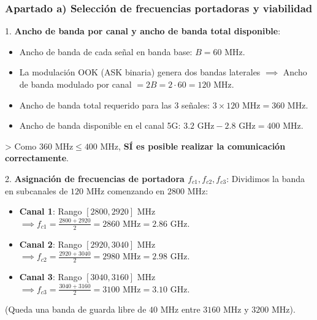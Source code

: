 \begin{resolucion}
\subsubsection*{Apartado a) Selección de frecuencias portadoras y viabilidad}

1. \textbf{Ancho de banda por canal y ancho de banda total disponible}:
   \begin{itemize}
       \item Ancho de banda de cada señal en banda base: $B = 60$ MHz.
       \item La modulación OOK (ASK binaria) genera dos bandas laterales $\implies$ Ancho de banda modulado por canal $= 2B = 2 \cdot 60 = 120$ MHz.
       \item Ancho de banda total requerido para las 3 señales: $3 \times 120 \text{ MHz} = 360 \text{ MHz}$.
       \item Ancho de banda disponible en el canal 5G: $3.2 \text{ GHz} - 2.8 \text{ GHz} = 400 \text{ MHz}$.
   \end{itemize}>
   Como $360 \text{ MHz} \le 400 \text{ MHz}$, \textbf{SÍ es posible realizar la comunicación correctamente}.

2. \textbf{Asignación de frecuencias de portadora $f_{c1}, f_{c2}, f_{c3}$}:
   Dividimos la banda en subcanales de $120$ MHz comenzando en $2800$ MHz:
   \begin{itemize}
       \item \textbf{Canal 1}: Rango $[2800, 2920]$ MHz $\implies f_{c1} = \frac{2800 + 2920}{2} = 2860 \text{ MHz} = 2.86 \text{ GHz}$.
       \item \textbf{Canal 2}: Rango $[2920, 3040]$ MHz $\implies f_{c2} = \frac{2920 + 3040}{2} = 2980 \text{ MHz} = 2.98 \text{ GHz}$.
       \item \textbf{Canal 3}: Rango $[3040, 3160]$ MHz $\implies f_{c3} = \frac{3040 + 3160}{2} = 3100 \text{ MHz} = 3.10 \text{ GHz}$.
   \end{itemize}
   (Queda una banda de guarda libre de $40$ MHz entre $3160$ MHz y $3200$ MHz).

\begin{center}
\end{center}


\end{resolucion}
